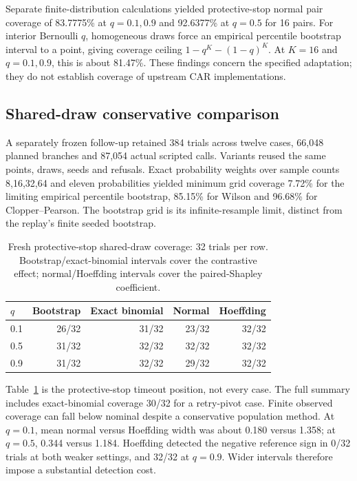 \documentclass[conference]{IEEEtran}
\begin{document}
Separate finite-distribution calculations yielded protective-stop normal pair
coverage of 83.7775\% at $q=0.1,0.9$ and 92.6377\% at $q=0.5$ for 16 pairs.
For interior Bernoulli $q$, homogeneous draws force an empirical percentile
bootstrap interval to a point, giving coverage ceiling
$1-q^K-(1-q)^K$. At $K=16$ and $q=0.1,0.9$, this is about 81.47\%.
These findings concern the specified adaptation; they do not establish
coverage of upstream CAR implementations.

\subsection{Shared-draw conservative comparison}
A separately frozen follow-up retained 384 trials across twelve cases,
66,048 planned branches and 87,054 actual scripted calls. Variants reused
the same points, draws, seeds and refusals. Exact probability weights over
sample counts 8,16,32,64 and eleven probabilities yielded minimum grid
coverage 7.72\% for the limiting empirical percentile bootstrap, 85.15\% for
Wilson and 96.68\% for Clopper--Pearson. The bootstrap grid is its
infinite-resample limit, distinct from the replay's finite seeded bootstrap.

\begin{table}[t]
\caption{Fresh protective-stop shared-draw coverage: 32 trials per row.
Bootstrap/exact-binomial intervals cover the contrastive effect;
normal/Hoeffding intervals cover the paired-Shapley coefficient.}
\label{tab:followup}
\centering\footnotesize
\begin{tabular}{lrrrr}
\toprule
$q$ & Bootstrap & Exact binomial & Normal & Hoeffding\\
\midrule
0.1 & 26/32 & 31/32 & 23/32 & 32/32\\
0.5 & 31/32 & 32/32 & 32/32 & 32/32\\
0.9 & 31/32 & 32/32 & 29/32 & 32/32\\
\bottomrule
\end{tabular}
\end{table}

Table~\ref{tab:followup} is the protective-stop timeout position, not every
case. The full summary includes exact-binomial coverage 30/32 for a retry-pivot
case. Finite observed coverage can fall below nominal despite a conservative
population method. At $q=0.1$, mean normal versus Hoeffding width was about
0.180 versus 1.358; at $q=0.5$, 0.344 versus 1.184. Hoeffding detected the
negative reference sign in 0/32 trials at both weaker settings, and 32/32 at
$q=0.9$. Wider intervals therefore impose a substantial detection cost.
\end{document}
